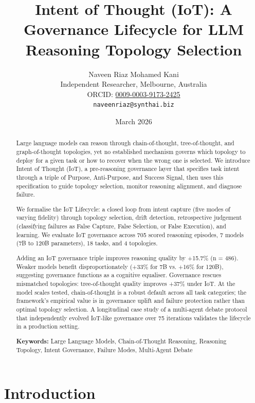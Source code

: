 \documentclass[11pt,a4paper]{article}
\title{\textbf{Intent of Thought (IoT): A Governance Lifecycle for LLM Reasoning Topology Selection}}
\author{
  Naveen Riaz Mohamed Kani \\
  Independent Researcher, Melbourne, Australia \\
  ORCID: \href{https://orcid.org/0009-0003-9173-2425}{0009-0003-9173-2425} \\
  \texttt{naveenriaz@synthai.biz}
}
\date{March 2026}
\begin{document}
\maketitle

\begin{abstract}
Large language models can reason through chain-of-thought, tree-of-thought, and graph-of-thought topologies, yet no established mechanism governs which topology to deploy for a given task or how to recover when the wrong one is selected. We introduce Intent of Thought (IoT), a pre-reasoning governance layer that specifies task intent through a triple of Purpose, Anti-Purpose, and Success Signal, then uses this specification to guide topology selection, monitor reasoning alignment, and diagnose failure. 

\par\medskip

We formalise the IoT Lifecycle: a closed loop from intent capture (five modes of varying fidelity) through topology selection, drift detection, retrospective judgement (classifying failures as False Capture, False Selection, or False Execution), and learning. We evaluate IoT governance across 705 scored reasoning episodes, 7 models (7B to 120B parameters), 18 tasks, and 4 topologies. 

\par\medskip

Adding an IoT governance triple improves reasoning quality by +15.7\% (n = 486). Weaker models benefit disproportionately (+33\% for 7B vs. +16\% for 120B), suggesting governance functions as a cognitive equaliser. Governance rescues mismatched topologies: tree-of-thought quality improves +37\% under IoT. At the model scales tested, chain-of-thought is a robust default across all task categories; the framework's empirical value is in governance uplift and failure protection rather than optimal topology selection. A longitudinal case study of a multi-agent debate protocol that independently evolved IoT-like governance over 75 iterations validates the lifecycle in a production setting.

\par\medskip\noindent\textbf{Keywords:} Large Language Models, Chain-of-Thought Reasoning, Reasoning Topology, Intent Governance, Failure Modes, Multi-Agent Debate
\end{abstract}

\newpage
\tableofcontents
\newpage

\section{Introduction}\label{introduction}
\end{document}
